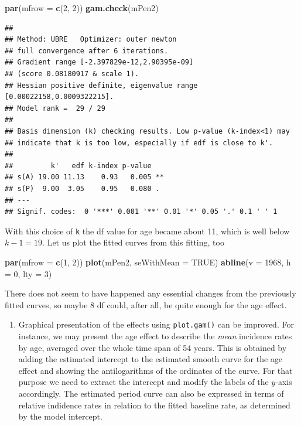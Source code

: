 \documentclass[
]{book}
\newenvironment{Shaded}{\begin{snugshade}}{\end{snugshade}}
\newcommand{\AttributeTok}[1]{\textcolor[rgb]{0.13,0.29,0.53}{#1}}
\newcommand{\ConstantTok}[1]{\textcolor[rgb]{0.56,0.35,0.01}{#1}}
\newcommand{\DecValTok}[1]{\textcolor[rgb]{0.00,0.00,0.81}{#1}}
\newcommand{\FunctionTok}[1]{\textcolor[rgb]{0.13,0.29,0.53}{\textbf{#1}}}
\newcommand{\NormalTok}[1]{#1}
\providecommand{\tightlist}{%
  \setlength{\itemsep}{0pt}\setlength{\parskip}{0pt}}
\begin{document}
\begin{Shaded}
\begin{Highlighting}[]
\FunctionTok{par}\NormalTok{(}\AttributeTok{mfrow =} \FunctionTok{c}\NormalTok{(}\DecValTok{2}\NormalTok{, }\DecValTok{2}\NormalTok{))}
\FunctionTok{gam.check}\NormalTok{(mPen2)}
\end{Highlighting}
\end{Shaded}

\begin{verbatim}
## 
## Method: UBRE   Optimizer: outer newton
## full convergence after 6 iterations.
## Gradient range [-2.397829e-12,2.90395e-09]
## (score 0.08180917 & scale 1).
## Hessian positive definite, eigenvalue range [0.00022158,0.0009322215].
## Model rank =  29 / 29 
## 
## Basis dimension (k) checking results. Low p-value (k-index<1) may
## indicate that k is too low, especially if edf is close to k'.
## 
##         k'   edf k-index p-value   
## s(A) 19.00 11.13    0.93   0.005 **
## s(P)  9.00  3.05    0.95   0.080 . 
## ---
## Signif. codes:  0 '***' 0.001 '**' 0.01 '*' 0.05 '.' 0.1 ' ' 1
\end{verbatim}

With this choice of \texttt{k} the df value for age became about 11,
which is well below \(k-1 = 19\). Let us plot the fitted curves from
this fitting, too

\begin{Shaded}
\begin{Highlighting}[]
\FunctionTok{par}\NormalTok{(}\AttributeTok{mfrow =} \FunctionTok{c}\NormalTok{(}\DecValTok{1}\NormalTok{, }\DecValTok{2}\NormalTok{))}
\FunctionTok{plot}\NormalTok{(mPen2, }\AttributeTok{seWithMean =} \ConstantTok{TRUE}\NormalTok{)}
\FunctionTok{abline}\NormalTok{(}\AttributeTok{v =} \DecValTok{1968}\NormalTok{, }\AttributeTok{h =} \DecValTok{0}\NormalTok{, }\AttributeTok{lty =} \DecValTok{3}\NormalTok{)}
\end{Highlighting}
\end{Shaded}

There does not seem to have happened any essential changes from the
previously fitted curves, so maybe 8 df could, after all, be quite
enough for the age effect.

\begin{enumerate}
\def\labelenumi{\arabic{enumi}.}
\setcounter{enumi}{4}
\tightlist
\item
  Graphical presentation of the effects using \texttt{plot.gam()}
  can be improved. For instance, we may present the
  age effect to describe the \emph{mean} incidence rates by age, averaged
  over the whole time span of 54 years. This is obtained by adding
  the estimated intercept
  to the estimated smooth curve for the age effect and showing
  the antilogarithms of the ordinates of the curve.
  For that purpose we need to extract the intercept and modify the
  labels of the \(y\)-axis accordingly. The estimated period curve
  can also be expressed in terms of
  relative indidence rates in relation to the fitted baseline rate,
  as determined by the model intercept.
\end{enumerate}
\end{document}
